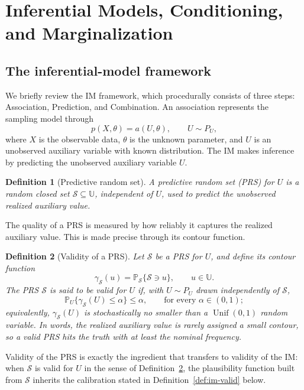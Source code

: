 \documentclass[12pt]{article}
\newtheorem{definition}{Definition}
\newcommand{\Prb}{\mathbb P}
\newcommand{\Unif}{\operatorname{Unif}}
\begin{document}
\section{Inferential Models, Conditioning, and Marginalization}
\label{sec:im}

\subsection{The inferential-model framework}

We briefly review the IM framework, which procedurally consists of three steps:
Association, Prediction, and Combination.  An association represents the sampling
model through
\[
p(X,\theta)=a(U,\theta),\qquad U\sim P_U,
\]
where \(X\) is the observable data, \(\theta\) is the unknown parameter, and
\(U\) is an unobserved auxiliary variable with known distribution.  The IM makes
inference by predicting the unobserved auxiliary variable \(U\).

\begin{definition}[Predictive random set]
A predictive random set (PRS) for \(U\) is a random closed set
\(\mathcal S\subseteq\mathbb U\), independent of \(U\), used to predict the
unobserved realized auxiliary value.
\end{definition}

The quality of a PRS is measured by how reliably it captures the realized
auxiliary value.  This is made precise through its contour function.

\begin{definition}[Validity of a PRS]
\label{def:prs-valid}
Let \(\mathcal S\) be a PRS for \(U\), and define its contour function
\[
\gamma_{\mathcal S}(u)
=
\Prb_{\mathcal S}\{\mathcal S\ni u\},
\qquad u\in\mathbb U .
\]
The PRS \(\mathcal S\) is said to be \emph{valid} for \(U\) if, with
\(U\sim P_U\) drawn independently of \(\mathcal S\),
\[
\Prb_{U}\{\gamma_{\mathcal S}(U)\leq\alpha\}\leq\alpha,
\qquad\text{for every }\alpha\in(0,1);
\]
equivalently, \(\gamma_{\mathcal S}(U)\) is stochastically no smaller than a
\(\Unif(0,1)\) random variable.  In words, the realized auxiliary value is
rarely assigned a small contour, so a valid PRS hits the truth with at least the
nominal frequency.
\end{definition}

Validity of the PRS is exactly the ingredient that transfers to validity of the
IM: when \(\mathcal S\) is valid for \(U\) in the sense of
Definition~\ref{def:prs-valid}, the plausibility function built from
\(\mathcal S\) inherits the calibration stated in Definition~\ref{def:im-valid}
below.
\end{document}
